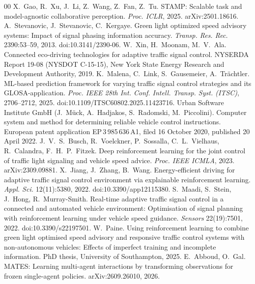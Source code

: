 \begin{thebibliography}{00}
 X.~Gao, R.~Xu, J.~Li, Z.~Wang, Z.~Fan, Z.~Tu. STAMP: Scalable task and model-agnostic collaborative perception. \emph{Proc. ICLR}, 2025. arXiv:2501.18616.
 A.~Stevanovic, J.~Stevanovic, C.~Kergaye. Green light optimized speed advisory systems: Impact of signal phasing information accuracy. \emph{Transp. Res. Rec.} 2390:53--59, 2013. doi:10.3141/2390-06.
 W.~Xin, H.~Moonam, M.~V.~Ala. Connected eco-driving technologies for adaptive traffic signal control. NYSERDA Report 19-08 (NYSDOT C-15-15), New York State Energy Research and Development Authority, 2019.
 K.~Malena, C.~Link, S.~Gausemeier, A.~Tr\"achtler. ML-based prediction framework for varying traffic signal control strategies and its GLOSA-application. \emph{Proc. IEEE 28th Int. Conf. Intell. Transp. Syst. (ITSC)}, 2706--2712, 2025. doi:10.1109/ITSC60802.2025.11423716.
 Urban Software Institute GmbH (J.~M\"uck, A.~Hadjakos, S.~Radomski, M.~Piccolini). Computer system and method for determining reliable vehicle control instructions. European patent application EP\,3\,985\,636\,A1, filed 16 October 2020, published 20 April 2022.
 J.~V.~S.~Busch, R.~Voelckner, P.~Sossalla, C.~L.~Vielhaus, R.~Calandra, F.~H.~P.~Fitzek. Deep reinforcement learning for the joint control of traffic light signaling and vehicle speed advice. \emph{Proc. IEEE ICMLA}, 2023. arXiv:2309.09881.
 X.~Jiang, J.~Zhang, B.~Wang. Energy-efficient driving for adaptive traffic signal control environment via explainable reinforcement learning. \emph{Appl. Sci.} 12(11):5380, 2022. doi:10.3390/app12115380.
 S.~Maadi, S.~Stein, J.~Hong, R.~Murray-Smith. Real-time adaptive traffic signal control in a connected and automated vehicle environment: Optimisation of signal planning with reinforcement learning under vehicle speed guidance. \emph{Sensors} 22(19):7501, 2022. doi:10.3390/s22197501.
 W.~Paine. Using reinforcement learning to combine green light optimised speed advisory and responsive traffic control systems with non-autonomous vehicles: Effects of imperfect training and incomplete information. PhD thesis, University of Southampton, 2025.
 E.~Abboud, O.~Gal. MATES: Learning multi-agent interactions by transforming observations for frozen single-agent policies. arXiv:2609.26010, 2026.
\end{thebibliography}

\appendices
